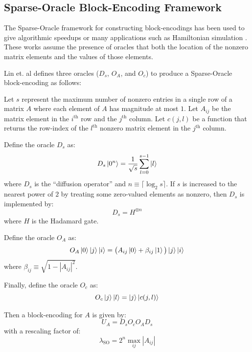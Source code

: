 \subsection{Sparse-Oracle Block-Encoding Framework}
\label{subsec:sparse-be}

The Sparse-Oracle framework for constructing block-encodings has been used to give algorithmic speedups or many applications such as Hamiltonian simulation \cite{berry2009black, childs2009universal, berry2015hamiltonian,berry2015simulating, low2017optimal,childs2017quantum,gilyen2019quantum}.
These works assume the presence of oracles that both the location of the nonzero matrix elements and the values of those elements.

Lin et. al \cite{lin2022lecture} defines three oracles ($D_s$, $O_A$, and $O_c$) to produce a Sparse-Oracle block-encoding as follows:
\begin{theorem}
    \label{th:sparse-oracles}
    Let $s$ represent the maximum number of nonzero entries in a single row of a matrix $A$ where each element of $A$ has magnitude at most $1$.
    Let $A_{ij}$ be the matrix element in the $i^\text{th}$ row and the $j^\text{th}$ column.
    Let $c(j, l)$ be a function that returns the row-index of the $l^\text{th}$ nonzero matrix element in the $j^\text{th}$ column.

    Define the oracle $D_s$ as:
    \begin{equation}
        \label{eq:diffusion}
        D_s \ket{0^n} = \frac{1}{\sqrt{s}} \sum_{l=0}^{s-1} \ket{l}
    \end{equation}
    where $D_s$ is the ``diffusion operator'' and $n \equiv \lceil \log_2{s} \rceil$.
    If $s$ is increased to the nearest power of $2$ by treating some zero-valued elements as nonzero, then $D_s$ is implemented by:
    \begin{equation}
        \label{eq:diffusion-had}
        D_s = H^{\otimes n}
    \end{equation}
    where $H$ is the Hadamard gate.

    Define the oracle $O_A$ as:
    \begin{equation}
        \label{eq:value-oracle}
        O_A \ket{0} \ket{j}\ket{i} = \big( A_{ij} \ket{0}  + \beta_{ij} \ket{1} \big) \ket{j}\ket{i}
    \end{equation}
    where $\beta_{ij} \equiv \sqrt{1 - |A_{ij}|^2}$.

    Finally, define the oracle $O_c$ as:
    \begin{equation}
        \label{eq:column-oracle}
        O_c \ket{j} \ket{l} = \ket{j}\ket{c(j, l)}
    \end{equation}

    Then a block-encoding for $A$ is given by:
    \begin{equation}
        \label{eq:so-be}
        U_A = D_s O_c O_A D_s
    \end{equation}
    with a rescaling factor of:
    \begin{equation}
        \lambda_\text{SO} = 2^n \max_{ij} {|A_{ij}|} 
    \end{equation}

\end{theorem}
